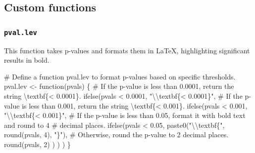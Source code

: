 \documentclass[
  bookmarksnumbered]{article}
\newenvironment{Shaded}{\begin{snugshade}}{\end{snugshade}}
\newcommand{\CommentTok}[1]{\textcolor[rgb]{0.50,0.62,0.50}{#1}}
\newcommand{\ControlFlowTok}[1]{\textcolor[rgb]{0.94,0.87,0.69}{#1}}
\newcommand{\DecValTok}[1]{\textcolor[rgb]{0.86,0.86,0.80}{#1}}
\newcommand{\FloatTok}[1]{\textcolor[rgb]{0.75,0.75,0.82}{#1}}
\newcommand{\FunctionTok}[1]{\textcolor[rgb]{0.94,0.94,0.56}{#1}}
\newcommand{\NormalTok}[1]{\textcolor[rgb]{0.80,0.80,0.80}{#1}}
\newcommand{\OtherTok}[1]{\textcolor[rgb]{0.94,0.94,0.56}{#1}}
\newcommand{\SpecialCharTok}[1]{\textcolor[rgb]{0.86,0.64,0.64}{#1}}
\newcommand{\StringTok}[1]{\textcolor[rgb]{0.80,0.58,0.58}{#1}}
\begin{document}
\subsection{Custom functions}\label{custom-functions}

\subsubsection{\texorpdfstring{\texttt{pval.lev}}{pval.lev}}\label{pval.lev}

This function takes p-values and formats them in \LaTeX, highlighting significant results in bold.

\begin{Shaded}
\begin{Highlighting}[]
\CommentTok{\# Define a function \textquotesingle{}pval.lev\textquotesingle{} to format p{-}values based on specific thresholds.}
\NormalTok{pval.lev }\OtherTok{\textless{}{-}} \ControlFlowTok{function}\NormalTok{(pvals) \{}
  \CommentTok{\# If the p{-}value is less than 0.0001, return the string \textquotesingle{}\textbackslash{}textbf\{\textless{} 0.0001\}\textquotesingle{}.}
  \FunctionTok{ifelse}\NormalTok{(pvals }\SpecialCharTok{\textless{}} \FloatTok{0.0001}\NormalTok{,}
    \StringTok{"}\SpecialCharTok{\textbackslash{}\textbackslash{}}\StringTok{textbf\{\textless{} 0.0001\}"}\NormalTok{,}
    \CommentTok{\# If the p{-}value is less than 0.001, return the string \textquotesingle{}\textbackslash{}textbf\{\textless{} 0.001\}\textquotesingle{}.}
    \FunctionTok{ifelse}\NormalTok{(pvals }\SpecialCharTok{\textless{}} \FloatTok{0.001}\NormalTok{,}
      \StringTok{"}\SpecialCharTok{\textbackslash{}\textbackslash{}}\StringTok{textbf\{\textless{} 0.001\}"}\NormalTok{,}
      \CommentTok{\# If the p{-}value is less than 0.05, format it with bold text and round to 4}
      \CommentTok{\# decimal places.}
      \FunctionTok{ifelse}\NormalTok{(pvals }\SpecialCharTok{\textless{}} \FloatTok{0.05}\NormalTok{,}
        \FunctionTok{paste0}\NormalTok{(}\StringTok{"}\SpecialCharTok{\textbackslash{}\textbackslash{}}\StringTok{textbf\{"}\NormalTok{, }\FunctionTok{round}\NormalTok{(pvals, }\DecValTok{4}\NormalTok{), }\StringTok{"\}"}\NormalTok{),}
        \CommentTok{\# Otherwise, round the p{-}value to 2 decimal places.}
        \FunctionTok{round}\NormalTok{(pvals, }\DecValTok{2}\NormalTok{)}
\NormalTok{      )}
\NormalTok{    )}
\NormalTok{  )}
\NormalTok{\}}
\end{Highlighting}
\end{Shaded}
\end{document}
